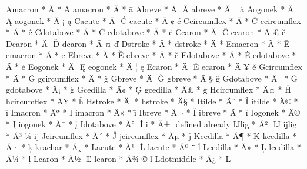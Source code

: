 \setucode Amacron * ^^c4^^80 * {\=A}
\setucode amacron * ^^c4^^81 * {\=a}
\setucode Abreve * ^^c4^^82 ^^80 {\u A}
\setucode abreve * ^^c4^^83 ^^a0 {\u a}
\setucode Aogonek * ^^c4^^84 ^^81 {\k A}
\setucode aogonek * ^^c4^^85 ^^a1 {\k a}
\setucode Cacute * ^^c4^^86 ^^82 {\'C}
\setucode cacute * ^^c4^^87 ^^a2 {\'c}
\setucode Ccircumflex * ^^c4^^88 * {\^C}
\setucode ccircumflex * ^^c4^^89 * {\^c}
\setucode Cdotabove * ^^c4^^8a * {\.C}
\setucode cdotabove * ^^c4^^8b * {\.c}
\setcsucode Ccaron * ^^c4^^8c ^^83 {\v C}
\setcsucode ccaron * ^^c4^^8d ^^a3 {\v c}
\setcsucode Dcaron * ^^c4^^8e ^^84 {\v D}
\setcsucode dcaron * ^^c4^^8f ^^a4 {\v d}
\setucode Dstroke * ^^c4^^90 * {\uuchar{}}
\setucode dstroke * ^^c4^^91 * {\uuchar{}}
\setucode Emacron * ^^c4^^92 * {\=E}
\setucode emacron * ^^c4^^93 * {\=e}
\setucode Ebreve * ^^c4^^94 * {\u E}
\setucode ebreve * ^^c4^^95 * {\u e}
\setucode Edotabove * ^^c4^^96 * {\.E}
\setucode edotabove * ^^c4^^97 * {\.e}
\setucode Eogonek * ^^c4^^98 ^^86 {\k E}
\setucode eogonek * ^^c4^^99 ^^a6 {\k e}
\setcsucode Ecaron * ^^c4^^9a ^^85 {\v E}
\setcsucode ecaron * ^^c4^^9b ^^a5 {\v e}
\setucode Gcircumflex * ^^c4^^9c * {\^G}
\setucode gcircumflex * ^^c4^^9d * {\^g}
\setucode Gbreve * ^^c4^^9e ^^87 {\u G}
\setucode gbreve * ^^c4^^9f ^^a7 {\u g}
\setucode Gdotabove * ^^c4^^a0 * {\.G}
\setucode gdotabove * ^^c4^^a1 * {\.g}
\setucode Gcedilla * ^^c4^^a2 * {\c G}
\setucode gcedilla * ^^c4^^a3 * {\c g}
\setucode Hcircumflex * ^^c4^^a4 * {\^H}
\setucode hcircumflex * ^^c4^^a5 * {\^h}
\setucode Hstroke * ^^c4^^a6 * {\uuchar{}}
\setucode hstroke * ^^c4^^a7 * {\uuchar{}}
\setucode Itilde * ^^c4^^a8 * {\~I}
\setucode itilde * ^^c4^^a9 * {\~\i}
\setucode Imacron * ^^c4^^aa * {\=I}
\setucode imacron * ^^c4^^ab * {\=\i}
\setucode Ibreve * ^^c4^^ac * {\u I}
\setucode ibreve * ^^c4^^ad * {\u i}
\setucode Iogonek * ^^c4^^ae * {\k I}
\setucode iogonek * ^^c4^^af * {\k i}
\setucode Idotabove * ^^c4^^b0 ^^9d {\.I}
\setucode i * ^^c4^^b1 ^^19 {defined already}
\setucode IJlig * ^^c4^^b2 ^^9c {IJ}
\setucode ijlig * ^^c4^^b3 ^^bc {ij}
\setucode Jcircumflex * ^^c4^^b4 * {\^J}
\setucode jcircumflex * ^^c4^^b5 * {\^j}
\setucode Kcedilla * ^^c4^^b6 * {\c K}
\setucode kcedilla * ^^c4^^b7 * {\c k}
\setucode krachar * ^^c4^^b8 * {\uuchar{}}
\setcsucode Lacute * ^^c4^^b9 ^^88 {\'L}
\setcsucode lacute * ^^c4^^ba ^^a8 {\'l}
\setucode Lcedilla * ^^c4^^bb * {\c L}
\setucode lcedilla * ^^c4^^bc * {\c l}
\setcsucode Lcaron * ^^c4^^bd ^^89 {\v L}
\setcsucode lcaron * ^^c4^^be ^^a9 {\v l}
\setucode Ldotmiddle * ^^c4^^bf * {L}

